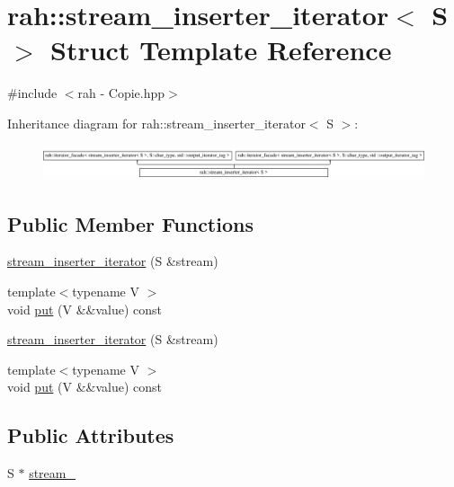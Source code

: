 \hypertarget{structrah_1_1stream__inserter__iterator}{}\section{rah\+::stream\+\_\+inserter\+\_\+iterator$<$ S $>$ Struct Template Reference}
\label{structrah_1_1stream__inserter__iterator}


{\ttfamily \#include $<$rah -\/ Copie.\+hpp$>$}

Inheritance diagram for rah\+::stream\+\_\+inserter\+\_\+iterator$<$ S $>$\+:\begin{figure}[H]
\begin{center}
\leavevmode
\includegraphics[height=1.033210cm]{structrah_1_1stream__inserter__iterator}
\end{center}
\end{figure}
\subsection*{Public Member Functions}
\begin{DoxyCompactItemize}
\item 
\mbox{\hyperlink{structrah_1_1stream__inserter__iterator_a0b096d8edfc691c1fdadd919252ce87d}{stream\+\_\+inserter\+\_\+iterator}} (S \&stream)
\item 
{\footnotesize template$<$typename V $>$ }\\void \mbox{\hyperlink{structrah_1_1stream__inserter__iterator_a449c0bfdb9f253260430c0184ef370fe}{put}} (V \&\&value) const
\item 
\mbox{\hyperlink{structrah_1_1stream__inserter__iterator_a0b096d8edfc691c1fdadd919252ce87d}{stream\+\_\+inserter\+\_\+iterator}} (S \&stream)
\item 
{\footnotesize template$<$typename V $>$ }\\void \mbox{\hyperlink{structrah_1_1stream__inserter__iterator_a449c0bfdb9f253260430c0184ef370fe}{put}} (V \&\&value) const
\end{DoxyCompactItemize}
\subsection*{Public Attributes}
\begin{DoxyCompactItemize}
\item 
S $\ast$ \mbox{\hyperlink{structrah_1_1stream__inserter__iterator_ab8594076013c695b314616093e8fdb4c}{stream\+\_\+}}
\end{DoxyCompactItemize}


